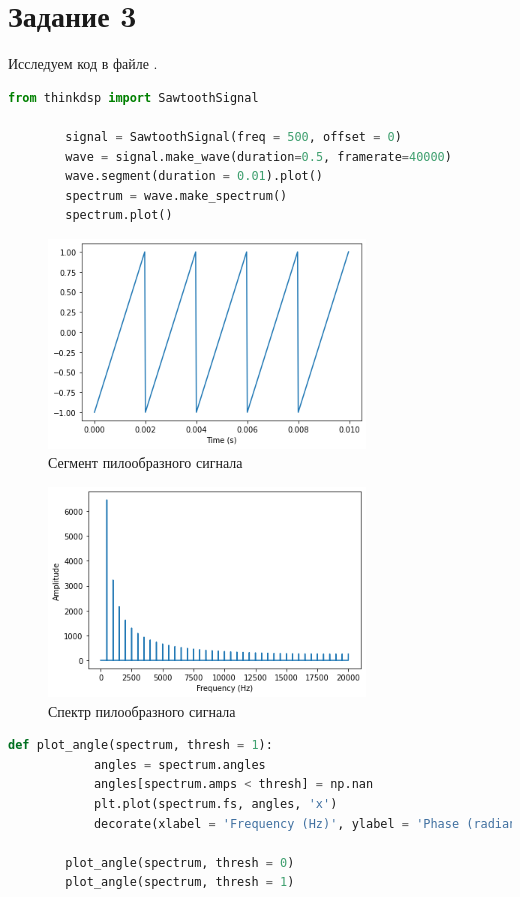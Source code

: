 \documentclass[a4paper, 12pt]{report}
\begin{document}
	\section{Задание 3}
	Исследуем код в файле .
	\begin{lstlisting}[language=Python,caption=Начало исследования]
		from thinkdsp import SawtoothSignal

		signal = SawtoothSignal(freq = 500, offset = 0)
		wave = signal.make_wave(duration=0.5, framerate=40000)
		wave.segment(duration = 0.01).plot()
		spectrum = wave.make_spectrum()
		spectrum.plot()
	\end{lstlisting}
	\begin{figure}[H]
		\centering
		\includegraphics[width=0.75\textwidth]{test1.png}
		\caption{Сегмент пилообразного сигнала}
		\label{fig:test1}
	\end{figure}
	\begin{figure}[H]
		\centering
		\includegraphics[width=0.75\textwidth]{test2.png}
		\caption{Спектр пилообразного сигнала}
		\label{fig:test2}
	\end{figure}
	\begin{lstlisting}[language=Python,caption=Угловая часть спектра]
		def plot_angle(spectrum, thresh = 1):
			angles = spectrum.angles
			angles[spectrum.amps < thresh] = np.nan
			plt.plot(spectrum.fs, angles, 'x')
			decorate(xlabel = 'Frequency (Hz)', ylabel = 'Phase (radian)')

		plot_angle(spectrum, thresh = 0)
		plot_angle(spectrum, thresh = 1)
	\end{lstlisting}
\end{document}

